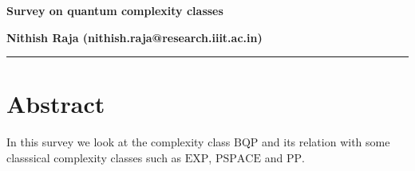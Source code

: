 

\noindent\textbf{\Large Survey on quantum complexity classes}
\vspace{2em}

\noindent
\textbf{Nithish Raja (nithish.raja@research.iiit.ac.in)}\\

\hrule

\section{Abstract}

In this survey we look at the complexity class $\mathrm{BQP}$ and its relation with some classsical complexity classes such as $\mathrm{EXP}$, $\mathrm{PSPACE}$ and $\mathrm{PP}$.

